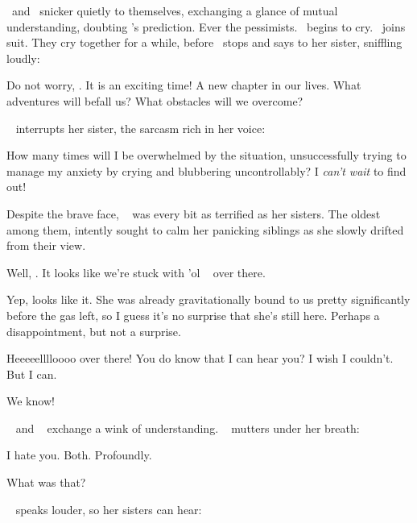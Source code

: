 \documentclass[main.tex]{subfiles}
\begin{document}
\par \nar \rmtaygete~and \rmalcyone~snicker quietly to themselves, exchanging a glance of mutual understanding, doubting \rmmaia's prediction.  Ever the pessimists.  \rmelectra~begins to cry.  \rmsterope~joins suit.  They cry together for a while, before \rmsterope~stops and says to her sister, sniffling loudly:

\par \Sterope Do not worry, \rmelectra.  It is an exciting time!  A new chapter in our lives.  What adventures will befall us?  What obstacles will we overcome?  

\par \nar \rmelectra~ interrupts her sister, the sarcasm rich in her voice:

\par \Electra How many times will I be overwhelmed by the situation, unsuccessfully trying to manage my anxiety by crying and blubbering uncontrollably? I \textit{can't wait} to find out!

\par \nar Despite the brave face, \rmmaia~ was every bit as terrified as her sisters.  The oldest among them, \rmmaia intently sought to calm her panicking siblings as she slowly drifted from their view.

\par \Taygete Well, \rmalcyone.  It looks like we're stuck with 'ol \rmcelaeno~ over there.

\par \Alcyone Yep, looks like it.  She was already gravitationally bound to us pretty significantly before the gas left, so I guess it's no surprise that she's still here.  Perhaps a disappointment, but not a surprise.

\par \Celaeno Heeeeelllloooo over there!  You do know that I can hear you?  I wish I couldn't.  But I can.  

\par \Taygete We know! 

\par \nar \rmtaygete~ and \rmalcyone~ exchange a wink of understanding.  \rmcelaeno~ mutters under her breath:

\par \Celaeno I hate you.  Both.  Profoundly.

\par \Taygete What was that?

\par \nar \rmcelaeno~ speaks louder, so her sisters can hear:
\end{document}
